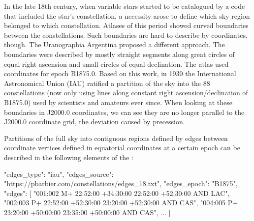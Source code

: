 In the late 18th century, when variable stars started to be catalogued by a code that included the star's constellation, 
a necessity arose to define which sky region belonged to which constellation. 
Atlases of this period showed curved boundaries between the constellations. 
Such boundaries are hard to describe by coordinates, though. The Uranographia Argentina \citep{1879RNAO....1....1G} proposed a different approach.
The boundaries were described by mostly straight segments along great circles of equal right ascension and small circles of equal declination. 
The atlas used coordinates for epoch B1875.0. 
Based on this work, in 1930 the International Astronomical Union (IAU) ratified a partition of the sky into the 88 constellations 
(now only using lines along constant right ascension/declination of B1875.0) used by scientists and amateurs ever since.
When looking at these boundaries in J2000.0 coordinates, we can see they are no longer parallel to the J2000.0 coordinate grid, the deviation caused by precession. 

Partitions of the full sky into contiguous regions defined by edges between coordinate vertices defined in  
equatorial coordinates at a certain  epoch can be described in the following elements of the :

\begin{jsonfile}[\scriptsize]
  "edges_type": "iau",
  "edges_source": "https://pbarbier.com/constellations/edges_18.txt",
  "edges_epoch": "B1875",
  "edges": [
    "001:002 M+ 22:52:00 +34:30:00 22:52:00 +52:30:00 AND LAC",
    "002:003 P+ 22:52:00 +52:30:00 23:20:00 +52:30:00 AND CAS",
    "004:005 P+ 23:20:00 +50:00:00 23:35:00 +50:00:00 AND CAS",
	...
	]
\end{jsonfile}



